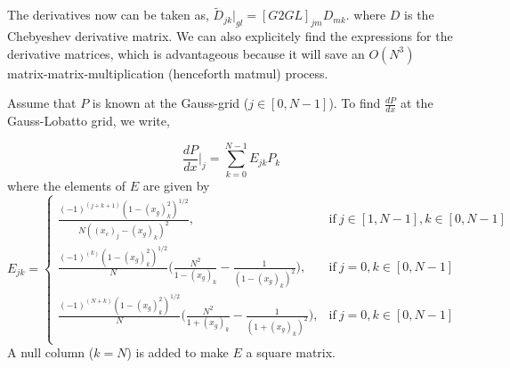 \documentclass{article}
\begin{document}
The derivatives now can be taken as, $\tilde{D}_{jk} \bigg|_{gl} = [G2GL]_{jm}D_{mk}$. where $D$ is the Chebyeshev derivative matrix. We can also explicitely find the expressions for the derivative matrices, which is advantageous because it will save an $O(N^{3})$ matrix-matrix-multiplication (henceforth matmul) process.

Assume that $P$ is known at the Gauss-grid ($j \in [0, N-1]$). To find $\frac{dP}{dx}$ at the Gauss-Lobatto grid, we write,

\begin{equation}\label{eq:dPdx_at_gl}
 \frac{dP}{dx}\bigg|_{j} = \sum_{k=0}^{N-1} E_{jk} P_{k}
\end{equation}
where the elements of $E$ are given by 
\begin{equation}
 E_{jk} = \begin{cases}
      \frac{(-1)^{(j + k + 1)} (1- (x_{g})_{k}^{2})^{1/2}}{N((x_{c})_{j} - (x_{g})_{k})^{2}}, & \text{if}\ j \in [1, N-1],   k \in [0, N-1] \\
      \frac{(-1)^{(k)} (1- (x_{g})_{k}^{2})^{1/2}}{N}\bigg( \frac{N^{2}}{1-(x_{g})_{k}} - \frac{1}{(1-(x_{g})_{k})^{2}}\bigg), & \text{if}\ j = 0,   k \in [0, N-1] \\
      \frac{(-1)^{(N+k)} (1- (x_{g})_{k}^{2})^{1/2}}{N}\bigg( \frac{N^{2}}{1+(x_{g})_{k}} - \frac{1}{(1+(x_{g})_{k})^{2}}\bigg), & \text{if}\ j = 0,   k \in [0, N-1] \\
    \end{cases}
\end{equation}
A null column ($k=N$) is added to make $E$ a square matrix. 
\end{document}
